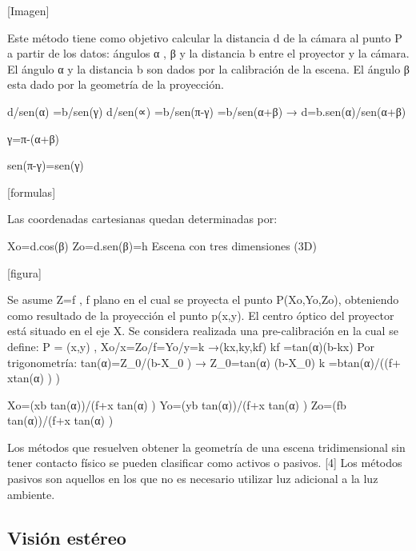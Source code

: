 [Imagen]

Este método tiene como objetivo calcular la distancia d de la cámara al punto P a partir de los datos: ángulos α  , β  y la distancia b entre el proyector y la cámara.
El ángulo α     y la distancia b son dados por la calibración de la escena.
El ángulo  β    esta dado por la geometría de la proyección.

d/sen(α) =b/sen(γ)                  d/sen(∝) =b/sen(π-γ) =b/sen(α+β)    → d=b.sen(α)/sen(α+β)

γ=π-(α+β)

sen(π-γ)=sen(γ)

[formulas]

Las coordenadas cartesianas quedan determinadas por:

Xo=d.cos(β)
Zo=d.sen(β)=h
Escena con tres dimensiones (3D)

[figura]

Se asume Z=f  , f plano en el cual se proyecta el punto P(Xo,Yo,Zo), obteniendo como resultado de la proyección el punto p(x,y).
El centro óptico del proyector está situado en el eje X.
Se considera realizada una  pre-calibración en la cual
se define:
P = (x,y) ,     Xo/x=Zo/f=Yo/y=k  →(kx,ky,kf)
                                     kf  =tan(α)(b-kx)  
Por  trigonometría:
tan(α)=Z_0/(b-X_0 )  → Z_0=tan⁡(α) (b-X_0)            k  =btan(α)/((f+ xtan(α) ) )

Xo=(xb tan(α))/(f+x tan(α) )            Yo=(yb tan(α))/(f+x tan(α) )            Zo=(fb tan(α))/(f+x tan(α) )

Los métodos que resuelven obtener la geometría de una escena tridimensional sin tener contacto físico se pueden clasificar como activos o pasivos. [4]
Los métodos pasivos son aquellos en los que no es necesario utilizar luz adicional a la luz ambiente.

\subsection{Visión estéreo}

